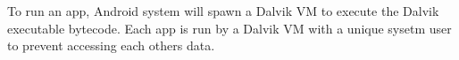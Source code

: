 To run an app, Android system will spawn a Dalvik VM to execute the Dalvik
executable bytecode. Each app is run by a Dalvik VM with a unique sysetm user
to prevent accessing each others data.

%
